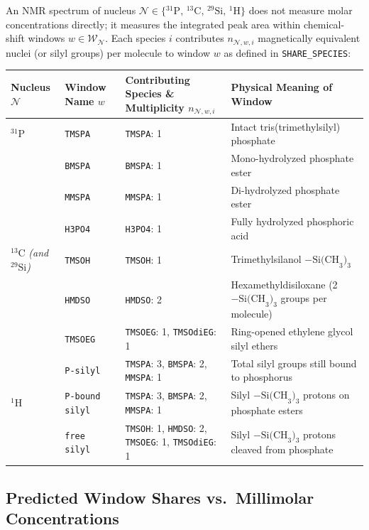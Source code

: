 \documentclass[11pt,a4paper]{article}
\begin{document}
An NMR spectrum of nucleus $\mathcal{N} \in \{ {}^{31}\text{P},\, {}^{13}\text{C},\, {}^{29}\text{Si},\, {}^{1}\text{H} \}$ does not measure molar concentrations directly; it measures the integrated peak area within chemical-shift windows $w \in \mathcal{W}_{\mathcal{N}}$. Each species $i$ contributes $n_{\mathcal{N}, w, i}$ magnetically equivalent nuclei (or silyl groups) per molecule to window $w$ as defined in \texttt{SHARE\_\allowbreak{}SPECIES}:

\begin{tabularx}{\textwidth}{L{2.8cm} L{2.4cm} L{4.6cm} Y}
\toprule
\textbf{Nucleus $\mathcal{N}$} & \textbf{Window Name $w$} & \textbf{Contributing Species \& Multiplicity $n_{\mathcal{N}, w, i}$} & \textbf{Physical Meaning of Window} \\
\midrule
\textbf{$^{31}\text{P}$} & \texttt{TMSPA} & \texttt{TMSPA}: 1 & Intact tris(trimethylsilyl) phosphate \\
 & \texttt{BMSPA} & \texttt{BMSPA}: 1 & Mono-hydrolyzed phosphate ester \\
 & \texttt{MMSPA} & \texttt{MMSPA}: 1 & Di-hydrolyzed phosphate ester \\
 & \texttt{H3PO4} & \texttt{H3PO4}: 1 & Fully hydrolyzed phosphoric acid \\
\midrule
\textbf{$^{13}\text{C}$} \emph{(and $^{29}\text{Si}$)} & \texttt{TMSOH} & \texttt{TMSOH}: 1 & Trimethylsilanol $-\text{Si(CH}_3)_3$ \\
 & \texttt{HMDSO} & \texttt{HMDSO}: 2 & Hexamethyldisiloxane (2 $-\text{Si(CH}_3)_3$ groups per molecule) \\
 & \texttt{TMSOEG} & \texttt{TMSOEG}: 1, \texttt{TMSOdiEG}: 1 & Ring-opened ethylene glycol silyl ethers \\
 & \texttt{P-silyl} & \texttt{TMSPA}: 3, \texttt{BMSPA}: 2, \texttt{MMSPA}: 1 & Total silyl groups still bound to phosphorus \\
\midrule
\textbf{$^1\text{H}$} & \texttt{P-bound silyl} & \texttt{TMSPA}: 3, \texttt{BMSPA}: 2, \texttt{MMSPA}: 1 & Silyl $-\text{Si(CH}_3)_3$ protons on phosphate esters \\
 & \texttt{free silyl} & \texttt{TMSOH}: 1, \texttt{HMDSO}: 2, \texttt{TMSOEG}: 1, \texttt{TMSOdiEG}: 1 & Silyl $-\text{Si(CH}_3)_3$ protons cleaved from phosphate \\
\bottomrule
\end{tabularx}

\subsection{Predicted Window Shares vs.\ Millimolar Concentrations}
\end{document}
